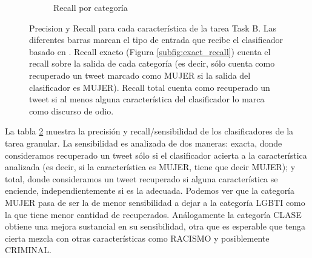 \begin{figure}[ht]
\begin{subfigure}[b]{\textwidth}
        \caption{Recall por categoría}
        \label{subfig:total_recall}
    \end{subfigure}
    \caption{Precision y Recall para cada característica de la tarea Task B. Las diferentes barras marcan el tipo de entrada que recibe el clasificador basado en \beto{}. Recall exacto (Figura \ref{subfig:exact_recall}) cuenta el recall sobre la salida de cada categoría (es decir, sólo cuenta como recuperado un tweet marcado como MUJER si la salida del clasificador es MUJER). Recall total cuenta como recuperado un tweet si al menos alguna característica del clasificador lo marca como discurso de odio.}
    \label{fig:precision_recall}
\end{figure}

La tabla \ref{fig:precision_recall} muestra la precisión y recall/sensibilidad de los clasificadores de la tarea granular. La sensibilidad es analizada de dos maneras: exacta, donde consideramos recuperado un tweet sólo si el clasificador acierta a la característica analizada (es decir, si la característica es MUJER, tiene que decir MUJER); y total, donde consideramos un tweet recuperado si alguna característica se enciende, independientemente si es la adecuada. Podemos ver que la categoría MUJER pasa de ser la de menor sensibilidad a dejar a la categoría LGBTI como la que tiene menor cantidad de recuperados. Análogamente la categoría CLASE obtiene una mejora sustancial en su sensibilidad, otra que es esperable que tenga cierta mezcla con otras características como RACISMO y posiblemente CRIMINAL.

